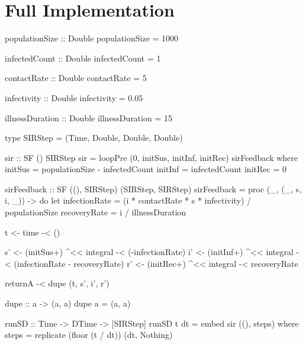 \newpage

\section{Full Implementation}

\begin{HaskellCode}
populationSize :: Double
populationSize = 1000

infectedCount :: Double
infectedCount = 1

contactRate :: Double
contactRate = 5

infectivity :: Double
infectivity = 0.05

illnessDuration :: Double
illnessDuration = 15

type SIRStep = (Time, Double, Double, Double)

sir :: SF () SIRStep
sir = loopPre (0, initSus, initInf, initRec) sirFeedback
  where
    initSus = populationSize - infectedCount
    initInf = infectedCount
    initRec = 0

    sirFeedback :: SF ((), SIRStep) (SIRStep, SIRStep)
    sirFeedback = proc (_, (_, s, i, _)) -> do
      let infectionRate = (i * contactRate * s * infectivity) / populationSize
          recoveryRate  = i / illnessDuration

      t <- time -< ()

      s' <- (initSus+) ^<< integral -< (-infectionRate)
      i' <- (initInf+) ^<< integral -< (infectionRate - recoveryRate)
      r' <- (initRec+) ^<< integral -< recoveryRate

      returnA -< dupe (t, s', i', r')

    dupe :: a -> (a, a)
    dupe a = (a, a)

runSD :: Time -> DTime -> [SIRStep]
runSD t dt = embed sir ((), steps)
  where
    steps = replicate (floor (t / dt)) (dt, Nothing)
\end{HaskellCode}